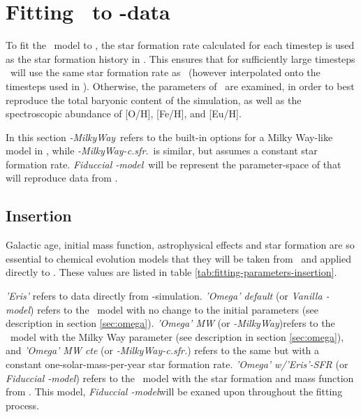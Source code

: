 \section{Fitting \omegamodel\ to \eris-data}
\setlength{}
\newcommand\mwomega{\textit{\omegamodel-MilkyWay}}
\newcommand\mwcomega{\textit{\omegamodel-MilkyWay-c.sfr.}}
\newcommand\vanillaomega{\textit{Vanilla \omegamodel-model}}
\newcommand\fiduccialomega{\textit{Fiduccial \omegamodel-model}}

To fit the \omegamodel\ model to \eris, the star formation rate calculated for each timestep is used as the star formation history in \omegamodel.
This ensures that for sufficiently large timesteps \omegamodel\ will use the same star formation rate as \eris\ (however interpolated onto the timesteps used in \omegamodel).
Otherwise, the parameters of \omegamodel\ are examined, in order to best reproduce the total baryonic content of the simulation, as well as the spectroscopic abundance of [O/H], [Fe/H], and [Eu/H].

In this section \mwomega\ refers to the built-in options for a Milky Way-like model in \omegamodel, while \mwcomega\ is similar, but assumes a constant star formation rate. \fiduccialomega\ will be represent the parameter-space of \omegamodel that will reproduce data from \eris.

\subsection{Insertion}
\newcommand\insertion{insertion}
Galactic age, initial mass function, astrophysical effects and star formation are so essential to chemical evolution models that they will be taken from \eris\ and applied directly to \omegamodel.
These values are listed in table \ref{tab:fitting-parameters-insertion}.

\textit{'Eris'} refers to data directly from \eris-simulation. \textit{'Omega' default} (or \vanillaomega) refers to the \omegamodel\ model with no change to the initial parameters (see description in section \ref{sec:omega}). \textit{'Omega' MW} (or \mwomega)refers to the \omegamodel\ model with the Milky Way parameter (see description in section \ref{sec:omega}), and \textit{'Omega' MW cte} (or \mwcomega) refers to the same but with a constant one-solar-mass-per-year star formation rate. \textit{'Omega' w/'Eris'-SFR} (or \fiduccialomega) refers to the \omegamodel\ model with the star formation and mass function from \eris. This model, \fiduccialomega will be exaned upon throughout the fitting process.

